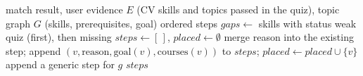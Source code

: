 \begin{algorithm}[t]
\caption{Learning roadmap with prerequisites}\label{alg:roadmap}
\begin{algorithmic}[1]
\Require match result, user evidence $E$ (CV skills and topics passed in the quiz), topic graph $G$ (skills, prerequisites, goal)
\Ensure ordered steps
\State $\mathit{gaps} \gets$ skills with status weak quiz (first), then missing
\State $\mathit{steps} \gets [\,]$, $\mathit{placed} \gets \emptyset$
   \State merge reason into the existing step; \Return \EndIf
     \State {} \EndIf
  \EndFor
  \State append $(v, \text{reason}, \text{goal}(v), \text{courses}(v))$ to $\mathit{steps}$; $\mathit{placed} \gets \mathit{placed} \cup \{v\}$
\EndProcedure
{}
   \State {}
  \Else \State append a generic step for $g$
  \EndIf
\EndFor
\State \Return $\mathit{steps}$ 
\end{algorithmic}
\end{algorithm}
